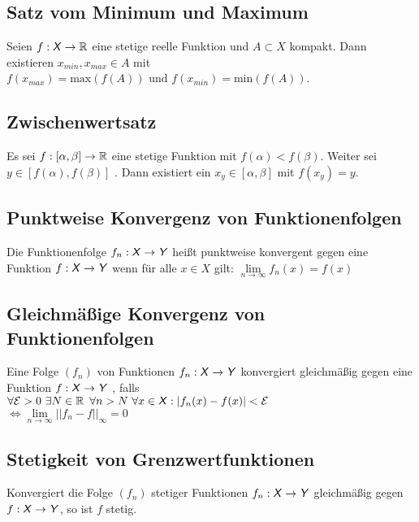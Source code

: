 \documentclass[german]{latex4ei/latex4ei_sheet}
\begin{document}
\begin{sectionbox}
	\subsection{Satz vom Minimum und Maximum}
	Seien $f : \operatorname{\textsf{\textit{X}}} \rightarrow \operatorname{\mathbb R}$ eine stetige reelle Funktion und $A \subset X$ kompakt. Dann existieren $x_{min},x_{max} \in A$ mit $f(x_{max}) = \text{max} (f(A)) \text{ und } f(x_{min}) = \text{min} (f(A))$.

\end{sectionbox}

\begin{sectionbox}
	\subsection{Zwischenwertsatz}
	Es sei $f : [\alpha,\beta] \rightarrow \operatorname{\mathbb R}$ eine stetige Funktion mit $f(\alpha) < f(\beta)$. Weiter sei $y \in [f(\alpha),f(\beta)]$ . Dann existiert ein $x_y \in [\alpha,\beta]$ mit $f(x_y) = y$.

\end{sectionbox}


\begin{sectionbox}
	\subsection{Punktweise Konvergenz von Funktionenfolgen}
	Die Funktionenfolge $f_n : \operatorname{\textsf{\textit{X}}} \rightarrow \operatorname{\textsf{\textit{Y}}}$ heißt punktweise konvergent gegen eine Funktion $f : \operatorname{\textsf{\textit{X}}} \rightarrow \operatorname{\textsf{\textit{Y}}}$ wenn für alle $x \in X$ gilt: $\lim \limits_{n \to \infty} f_n(x)=f(x)$

	\end{sectionbox}


\begin{sectionbox}
	\subsection{Gleichmäßige Konvergenz von Funktionenfolgen}
	Eine Folge $(f_n)$ von Funktionen $f_n : \operatorname{\textsf{\textit{X}}} \rightarrow \operatorname{\textsf{\textit{Y}}}$ konvergiert
gleichmäßig  gegen eine Funktion $f : \operatorname{\textsf{\textit{X}}} \rightarrow \operatorname{\textsf{\textit{Y}}}$ , falls \\
	$\forall \mathcal{E}>0 \text{  } \exists N \in \operatorname{\mathbb R} \text{   } \forall n > N \text{   } \forall x \in \operatorname{\textsf{\textit{X}}}: |f_n(x)-f(x)|<\mathcal{E}$\\
	$\Leftrightarrow \lim \limits_{n \to \infty} ||f_n-f ||_\infty = 0$


\end{sectionbox}
\begin{sectionbox}
	\subsection{Stetigkeit von Grenzwertfunktionen}
		Konvergiert die Folge $(f_n)$ stetiger Funktionen $f_n : \operatorname{\textsf{\textit{X}}} \rightarrow \operatorname{\textsf{\textit{Y}}}$ gleichmäßig gegen $f :\operatorname{\textsf{\textit{X}}} \rightarrow \operatorname{\textsf{\textit{Y}}}$, so ist $f$ stetig.

\end{sectionbox}
\end{document}
